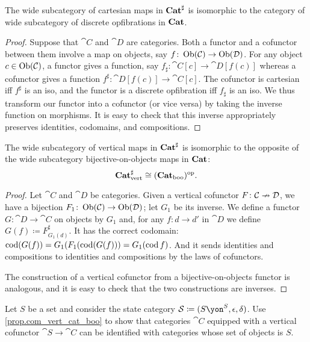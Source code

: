 \documentclass[DynamicalBook]{subfiles}
\begin{document}
\begin{proposition}
The wide subcategory of cartesian maps in $\textbf{Cat}^\sharp$ is isomorphic to the category of wide subcategory of discrete opfibrations in $\textbf{Cat}$.
\end{proposition}
\begin{proof}
Suppose that $\cat{C}$ and $\cat{D}$ are categories. Both a functor and a cofunctor between them involve a map on objects, say $f\colon\operatorname{Ob}(\mathcal{C})\to\operatorname{Ob}(\mathcal{D})$. For any object $c\in\operatorname{Ob}(\mathcal{C})$, a functor gives a function, say $f_\sharp\colon\cat{C}[c]\to\cat{D}[f(c)]$ whereas a cofunctor gives a function $f^\sharp\colon\cat{D}[f(c)]\to\cat{C}[c]$. The cofunctor is cartesian iff $f^\sharp$ is an iso, and the functor is a discrete opfibration iff $f_\sharp$ is an iso. We thus transform our functor into a cofunctor (or vice versa) by taking the inverse function on morphisms. It is easy to check that this inverse appropriately preserves identities, codomains, and compositions.
\end{proof}

\begin{proposition}\label{prop.com_vert_cat_boo}
The wide subcategory of vertical maps in $\textbf{Cat}^\sharp$ is isomorphic to the opposite of the wide subcategory bijective-on-objects maps in $\textbf{Cat}$:
\[
\textbf{Cat}^\sharp_{\text{vert}}\cong(\textbf{Cat}_{\text{boo}})^{\textnormal{op}}.
\]
\end{proposition}
\begin{proof}
Let $\cat{C}$ and $\cat{D}$ be categories. Given a vertical cofunctor $F\colon\mathcal{C}\nrightarrow\mathcal{D}$, we have a bijection $F_1\colon\operatorname{Ob}(\mathcal{C})\to\operatorname{Ob}(\mathcal{D})$; let $G_1$ be its inverse. We define a functor $G\colon\cat{D}\to\cat{C}$ on objects by $G_1$ and, for any $f\colon d\to d'$ in $\cat{D}$ we define $G(f)\coloneqq F^\sharp_{G_1(d)}$. It has the correct codomain: $\operatorname{cod}(G(f))=G_1(F_1(\operatorname{cod}(G(f)))=G_1(\operatorname{cod} f)$. And it sends identities and compositions to identities and compositions by the laws of cofunctors.

The construction of a vertical cofunctor from a bijective-on-objects functor is analogous, and it is easy to check that the two constructions are inverses.
\end{proof}

\begin{exercise}
Let $S$ be a set and consider the state category $\cat{S}\coloneqq(S\yon^S,\epsilon,\delta)$. Use \cref{prop.com_vert_cat_boo} to show that categories $\cat{C}$ equipped with a vertical cofunctor $\cat{S}\to\cat{C}$ can be identified with categories whose set of objects is $S$.
\end{exercise}
\end{document}

